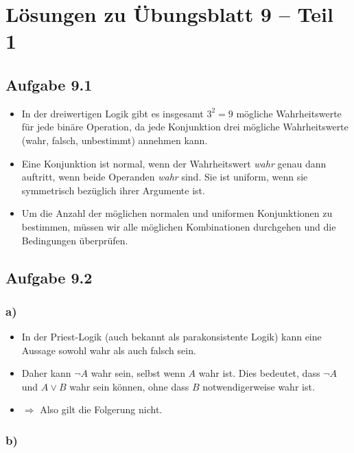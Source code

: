 \documentclass{article}
\begin{document}
\section*{Lösungen zu Übungsblatt 9 – Teil 1}

\subsection*{Aufgabe 9.1}

\begin{itemize}
    \item In der dreiwertigen Logik gibt es insgesamt \( 3^2 = 9 \) mögliche Wahrheitswerte für jede binäre Operation, da jede Konjunktion drei mögliche Wahrheitswerte (wahr, falsch, unbestimmt) annehmen kann.
    \item Eine Konjunktion ist normal, wenn der Wahrheitswert \textit{wahr} genau dann auftritt, wenn beide Operanden \textit{wahr} sind. Sie ist uniform, wenn sie symmetrisch bezüglich ihrer Argumente ist.
    \item Um die Anzahl der möglichen normalen und uniformen Konjunktionen zu bestimmen, müssen wir alle möglichen Kombinationen durchgehen und die Bedingungen überprüfen.
\end{itemize}

\subsection*{Aufgabe 9.2}

\subsubsection*{a)}

\begin{itemize}
    \item In der Priest-Logik (auch bekannt als parakonsistente Logik) kann eine Aussage sowohl wahr als auch falsch sein.
    \item Daher kann \( \neg A \) wahr sein, selbst wenn \( A \) wahr ist. Dies bedeutet, dass \( \neg A \) und \( A \lor B \) wahr sein können, ohne dass \( B \) notwendigerweise wahr ist.
    \item $\Rightarrow$ Also gilt die Folgerung nicht.
\end{itemize}


\subsubsection*{b)}
\end{document}
